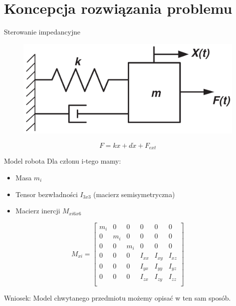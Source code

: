 \documentclass{beamer}
\begin{document}
\section{Koncepcja rozwiązania problemu}

	\begin{frame}{Sterowanie impedancyjne}
		\begin{figure}[h]
			\centering
			\includegraphics[scale=1.30]{mds}
		\end{figure}

	\begin{equation}
	F = kx + d\dot{x} + F_{ext}
	\end{equation}
\end{frame}

\begin{frame}{Model robota}
	Dla członu i-tego mamy:
	\begin{itemize}
		\item Masa $m_i$
		\item Tensor bezwładności $I_{3x3}$ (macierz semisymetryczna)
		\item Macierz inercji $M_{xi 6x6}$
	\end{itemize}
	\begin{equation}
	M_{xi}=
	\begin{bmatrix}
	m_i & 0 & 0 & 0 & 0 & 0 \\
	0 & m_i & 0 & 0 & 0 & 0 \\
	0 & 0 & m_i & 0 & 0 & 0 \\
	0 & 0 & 0 & I_{xx} & I_{xy} & I_{xz} \\
	0 & 0 & 0 & I_{yx} & I_{yy} & I_{yz} \\
	0 & 0 & 0 & I_{zx} & I_{zy} & I_{zz} \\

	\end{bmatrix}
	\end{equation}

	Wniosek: Model chwytanego przedmiotu możemy opisać w ten sam sposób.
\end{frame}
\end{document}
